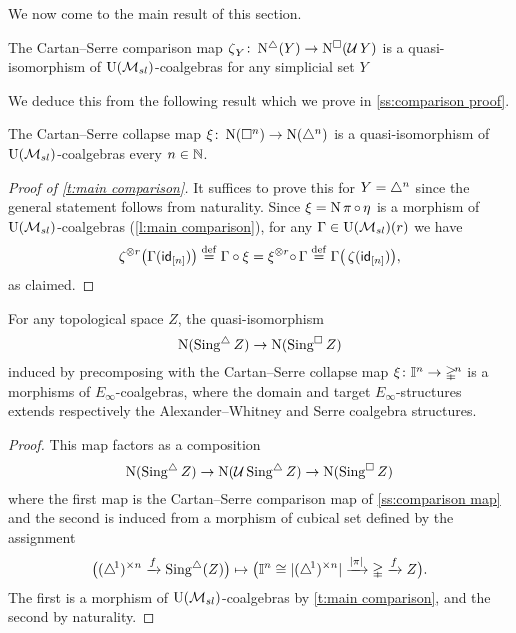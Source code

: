 We now come to the main result of this section.

\begin{theorem} \label{t:main comparison}
	The Cartan--Serre comparison map $\operatorname{\zeta}_Y \colon \operatorname{N^{\triangle}}(Y) \to \operatorname{N^{\square}}(\operatorname{\mathcal{U}} Y)$ is a quasi-isomorphism of ${\operatorname{U}(\mathcal{M}_{sl})}$-coalgebras for any simplicial set $Y$
\end{theorem}

We deduce this from the following result which we prove in \cref{ss:comparison proof}.

\begin{lemma} \label{l:main comparison}
	The Cartan--Serre collapse map $\operatorname{\xi} \colon \operatorname{N}(\square^n) \to \operatorname{N}(\triangle^n)$ is a quasi-isomorphism of ${\operatorname{U}(\mathcal{M}_{sl})}$-coalgebras every $n \in \mathbb{N}$.
\end{lemma}

\begin{proof}[Proof of \cref{t:main comparison}]
	It suffices to prove this for $Y = \triangle^n$ since the general statement follows from naturality.
	Since $\operatorname{\xi} = \operatorname{N} \operatorname{\pi} \circ \operatorname{\eta}$ is a morphism of ${\operatorname{U}(\mathcal{M}_{sl})}$-coalgebras (\cref{l:main comparison}), for any $\Gamma \in {\operatorname{U}(\mathcal{M}_{sl})}(r)$ we have
	\begin{align*}
	\operatorname{\zeta}^{\otimes r} \! \big( \Gamma(\mathsf{id}_{[n]}) \big) \stackrel{\mathrm{def}}{=}
	\Gamma \circ \operatorname{\xi} =
	\operatorname{\xi}^{\otimes r} \! \circ \, \Gamma \stackrel{\mathrm{def}}{=}
	\Gamma \big( \operatorname{\zeta} (\mathsf{id}_{[n]}) \big),
	\end{align*}
	as claimed.
\end{proof}

\begin{corollary} \label{t:topological comparison}
	For any topological space $Z$, the quasi-isomorphism
	\[
	\operatorname{N}(\operatorname{Sing^{\triangle}} Z) \to \operatorname{N}(\operatorname{Sing^{\square}} Z)
	\]
	induced by precomposing with the Cartan--Serre collapse map $\operatorname{\xi} \colon \mathbb{I}^n \to \mathbb{\Delta}^{\!n}$ is a morphisms of $E_\infty$-coalgebras, where the domain and target $E_\infty$-structures extends respectively the Alexander--Whitney and Serre coalgebra structures.
\end{corollary}

\begin{proof}
	This map factors as a composition
	\[
	\operatorname{N}(\operatorname{Sing^{\triangle}} Z) \to \operatorname{N}(\operatorname{\mathcal{U}} \operatorname{Sing^{\triangle}} Z) \to \operatorname{N}(\operatorname{Sing^{\square}} Z)
	\]
	where the first map is the Cartan--Serre comparison map of \cref{ss:comparison map} and the second is induced from a morphism of cubical set defined by the assignment
	\[
	\big( (\triangle^{\!1})^{\times n} \xrightarrow{f} \operatorname{Sing^{\triangle}}(Z) \big) \mapsto
	\big( \mathbb{I}^n \cong \lvert(\triangle^{\!1})^{\times n}\rvert \xrightarrow{\lvert\operatorname{\pi}\rvert} \mathbb{\Delta} \xrightarrow{f} Z \big).
	\]
	The first is a morphism of ${\operatorname{U}(\mathcal{M}_{sl})}$-coalgebras by \cref{t:main comparison}, and the second by naturality.
\end{proof}



